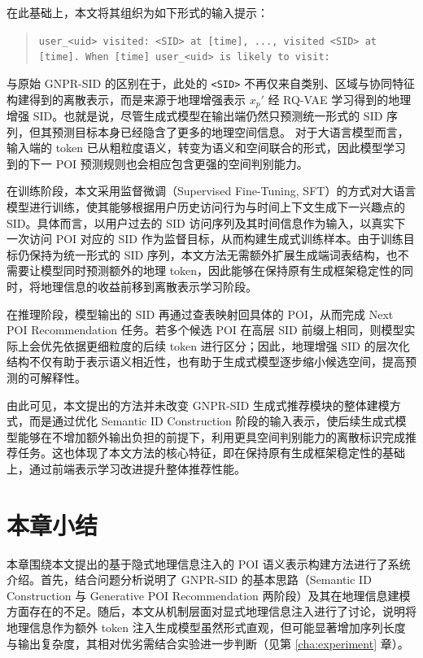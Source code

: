 在此基础上，本文将其组织为如下形式的输入提示：
\begin{quote}
\small
\texttt{user\_<uid> visited: <SID> at [time], ..., visited <SID> at [time]. When [time] user\_<uid> is likely to visit:}
\end{quote}

与原始 GNPR-SID 的区别在于，此处的 \texttt{<SID>} 不再仅来自类别、区域与协同特征构建得到的离散表示，而是来源于地理增强表示 $x_p'$ 经 RQ-VAE 学习得到的地理增强 SID。也就是说，尽管生成式模型在输出端仍然只预测统一形式的 SID 序列，但其预测目标本身已经隐含了更多的地理空间信息。
对于大语言模型而言，输入端的 token 已从粗粒度语义，转变为语义和空间联合的形式，因此模型学习到的下一 POI 预测规则也会相应包含更强的空间判别能力。

在训练阶段，本文采用监督微调（Supervised Fine-Tuning, SFT）的方式对大语言模型进行训练，使其能够根据用户历史访问行为与时间上下文生成下一兴趣点的 SID。具体而言，以用户过去的 SID 访问序列及其时间信息作为输入，以真实下一次访问 POI 对应的 SID 作为监督目标，从而构建生成式训练样本。由于训练目标仍保持为统一形式的 SID 序列，本文方法无需额外扩展生成端词表结构，也不需要让模型同时预测额外的地理 token，因此能够在保持原有生成框架稳定性的同时，将地理信息的收益前移到离散表示学习阶段。

在推理阶段，模型输出的 SID 再通过查表映射回具体的 POI，从而完成 Next POI Recommendation 任务。若多个候选 POI 在高层 SID 前缀上相同，则模型实际上会优先依据更细粒度的后续 token 进行区分；因此，地理增强 SID 的层次化结构不仅有助于表示语义相近性，也有助于生成式模型逐步缩小候选空间，提高预测的可解释性。

由此可见，本文提出的方法并未改变 GNPR-SID 生成式推荐模块的整体建模方式，而是通过优化 Semantic ID Construction 阶段的输入表示，使后续生成式模型能够在不增加额外输出负担的前提下，利用更具空间判别能力的离散标识完成推荐任务。这也体现了本文方法的核心特征，即在保持原有生成框架稳定性的基础上，通过前端表示学习改进提升整体推荐性能。

\section{本章小结}
\label{sec:method_summary}

本章围绕本文提出的基于隐式地理信息注入的 POI 语义表示构建方法进行了系统介绍。首先，结合问题分析说明了 GNPR-SID 的基本思路（Semantic ID Construction 与 Generative POI Recommendation 两阶段）及其在地理信息建模方面存在的不足。随后，本文从机制层面对显式地理信息注入进行了讨论，说明将地理信息作为额外 token 注入生成模型虽然形式直观，但可能显著增加序列长度与输出复杂度，其相对优劣需结合实验进一步判断（见第 \ref{cha:experiment} 章）。

